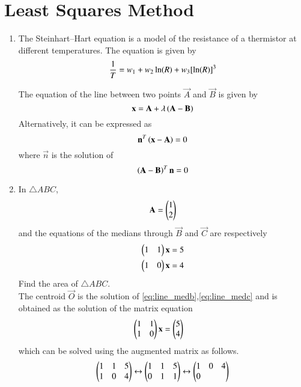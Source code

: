 \documentclass[journal,12pt,twocolumn]{IEEEtran}
\renewcommand\thesection{\arabic{section}}
\begin{document}
\section{Least Squares Method}
\begin{enumerate}[label=\thesection.\arabic*
,ref=\thesection.\theenumi]

\item The Steinhart–Hart equation is a model of the resistance of a 
thermistor at different temperatures. The equation is given by
\begin{equation}
\label{eq:ls_steiner}
{ {1 \over T}=w_1+w_2\ln(R)+w_3[\ln(R)]^{3}} 
\end{equation}

The equation of the line between two points $\vec{A}$ and $\vec{B}$ is given by
\begin{equation}
\mathbf{x} = \mathbf{A} + \lambda \left(\mathbf{A}-\mathbf{B}\right)
\end{equation}
%
Alternatively, it can be expressed as
\begin{equation}
\label{eq:line_normal}
\mathbf{n}^T\left(\mathbf{x}-\mathbf{A}\right) = 0
\end{equation}
%
where $\vec{n}$ is the solution of
\begin{equation}
\label{eq:normal_slope}
\left(\mathbf{A}-\mathbf{B}\right)^T\mathbf{n} = 0
\end{equation}
\item In $\triangle ABC$,
\begin{equation}
\label{eq:linea}
\mathbf{A}=\begin{pmatrix}1\\2\end{pmatrix}
\end{equation}
%
and the equations of the medians through $\vec{B}$ and $\vec{C}$
are respectively
\begin{align}
\label{eq:line_medb}
\begin{pmatrix}1 & 1\end{pmatrix}\mathbf{x}&=5
\\
\begin{pmatrix}1 & 0\end{pmatrix}\mathbf{x}&=4
\label{eq:line_medc}
\end{align}
%
Find the area of $\triangle ABC$.
\\
\solution The centroid $\vec{O}$ is the solution of \eqref{eq:line_medb},\eqref{eq:line_medc} and is obtained 
as the solution
of the matrix equation
\begin{align}
\begin{pmatrix}1 & 1 \\1 & 0\end{pmatrix}\mathbf{x}&=\begin{pmatrix}5 \\ 4\end{pmatrix}
\label{eq:line_matrix}
\end{align}
%
which can be solved using the augmented matrix as follows.
\begin{align}
\begin{pmatrix}1 & 1 & 5\\1 & 0 & 4\end{pmatrix} \leftrightarrow \begin{pmatrix}1 & 1 & 5\\0 & 1 & 1\end{pmatrix}\leftrightarrow  \begin{pmatrix}1 & 0 & 4\\0 & 
\end{pmatrix}
\end{align}
\end{enumerate}
\end{document}
